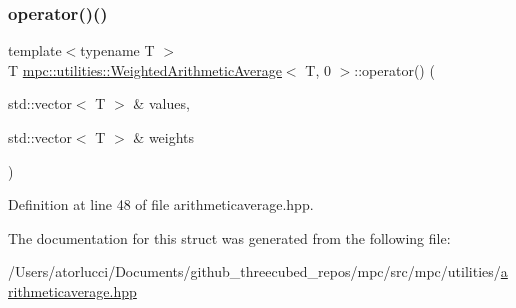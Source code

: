\subsubsection{\texorpdfstring{operator()()}{operator()()}}
{\footnotesize\ttfamily template$<$typename T $>$ \\
T \mbox{\hyperlink{structmpc_1_1utilities_1_1_weighted_arithmetic_average}{mpc\+::utilities\+::\+Weighted\+Arithmetic\+Average}}$<$ T, 0 $>$\+::operator() (\begin{DoxyParamCaption}\item[{std\+::vector$<$ T $>$ \&}]{values,  }\item[{std\+::vector$<$ T $>$ \&}]{weights }\end{DoxyParamCaption})\hspace{0.3cm}{\ttfamily [inline]}}



Definition at line 48 of file arithmeticaverage.\+hpp.



The documentation for this struct was generated from the following file\+:\begin{DoxyCompactItemize}
\item 
/\+Users/atorlucci/\+Documents/github\+\_\+threecubed\+\_\+repos/mpc/src/mpc/utilities/\mbox{\hyperlink{arithmeticaverage_8hpp}{arithmeticaverage.\+hpp}}\end{DoxyCompactItemize}
